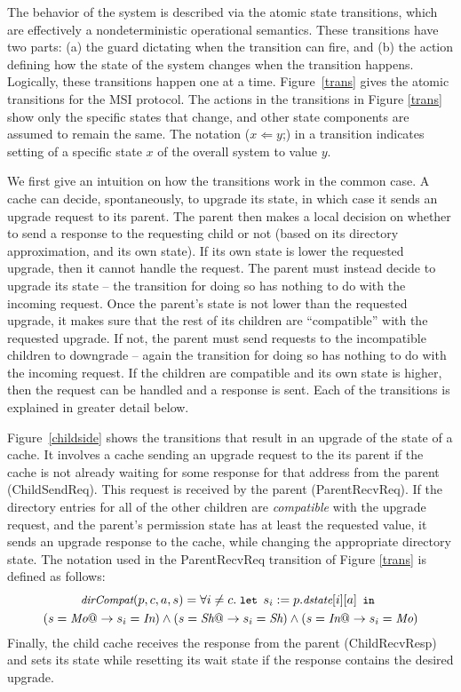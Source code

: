 The behavior of the system is described via the atomic state transitions, which
are effectively a nondeterministic operational semantics. These transitions
have two parts: (a) the guard dictating when the transition can fire, and (b)
the action defining how the state of the system changes when the transition
happens. Logically, these transitions happen one at a time.  Figure~\ref{trans}
gives the atomic transitions for the MSI protocol.  The actions in the
transitions in Figure \ref{trans} show only the specific states that change,
and other state components are assumed to remain the same.  The notation ($x
\Leftarrow y$;) in a transition indicates setting of a specific state $x$ of
the overall system to value $y$.

We first give an intuition on how the transitions work in the common case.
A cache can decide, spontaneously, to upgrade its state,
in which case it sends an upgrade request to its parent. The parent then makes
a local decision on whether to send a response to the requesting child or not
(based on its directory approximation, and its own state). If its own state is
lower the requested upgrade, then it cannot handle the request. The parent
must instead decide to upgrade its state -- the transition for doing so has
nothing to do with the incoming request.  Once the parent's state is not lower
than the requested upgrade, it makes sure that the rest of its children are
``compatible'' with the requested upgrade. If not, the parent must send
requests to the incompatible children to downgrade -- again the transition for
doing so has nothing to do with the incoming request. If the children are
compatible and its own state is higher, then the request can be handled and a
response is sent. Each of the transitions is explained in greater detail below.

Figure~\ref{childside} shows the transitions that result in an upgrade of the
state of a cache. It involves a cache sending an upgrade request to the its
parent if the cache is not already waiting for some response for that address
from the parent (ChildSendReq). This request is received by the parent
(ParentRecvReq). If the directory entries for all of the other children are
\emph{compatible} with the upgrade request, and the parent's permission state has
at least the requested value, it sends an upgrade response to the cache, while
changing the appropriate directory state. The notation \compat{} used in
the ParentRecvReq transition of Figure \ref{trans} is defined as follows:
\begin{multline*}
\small
\compat(p, c, a, s) = \forall i \ne c. \;
\mylet s_i := p.\dstate[i][a] \myin\\
 (s = \Mo @-> s_i = \In) \wedge (s = \Sh @-> s_i = \Sh) \wedge (s = \In @-> s_i = \Mo)
\end{multline*}
Finally, the child cache receives the response from the parent (ChildRecvResp)
and sets its state while resetting its wait state if the response contains the
desired upgrade.

